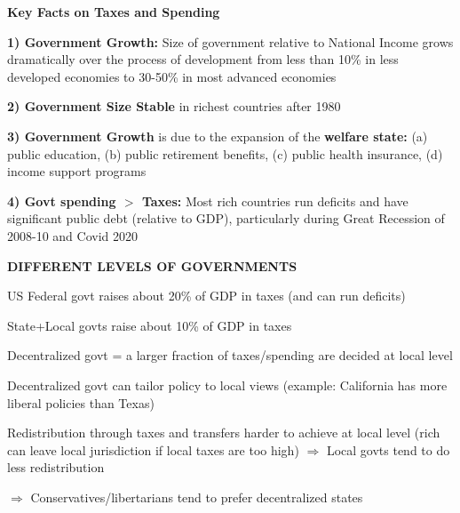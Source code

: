 \documentclass[landscape]{slides}
\begin{document}
\begin{slide}
\begin{center}
{\bf Key Facts on Taxes and Spending}
\end{center}
\textbf{1) Government Growth:} Size of government relative to National Income grows dramatically
over the process of development from less than 10\% in less developed economies to 30-50\% in most
advanced economies

\textbf{2) Government Size Stable} in richest countries after 1980

\textbf{3) Government Growth} is due to the expansion of the \textbf{welfare state:} (a) public education, (b) public retirement benefits, (c) public health insurance, (d) income support programs

\textbf{4) Govt spending $>$ Taxes:} Most rich countries run deficits and have significant public debt (relative to GDP),
particularly during Great Recession of 2008-10 and Covid 2020

\end{slide}



\begin{slide}

\end{slide}


\begin{slide}
\begin{center}
{\bf DIFFERENT LEVELS OF GOVERNMENTS}
\end{center}
US Federal govt raises about 20\% of GDP in taxes
(and can run deficits)

State+Local govts raise about 10\% of GDP in taxes

Decentralized govt = a larger fraction of taxes/spending are decided at local level



Decentralized govt can tailor policy to local views (example: California has more liberal policies than Texas)

Redistribution through taxes and transfers harder to achieve at local level (rich can leave local jurisdiction if local taxes are too high)
$\Rightarrow$ Local govts tend to do less redistribution

$\Rightarrow$ Conservatives/libertarians tend to prefer decentralized states 

\end{slide}
\end{document}
